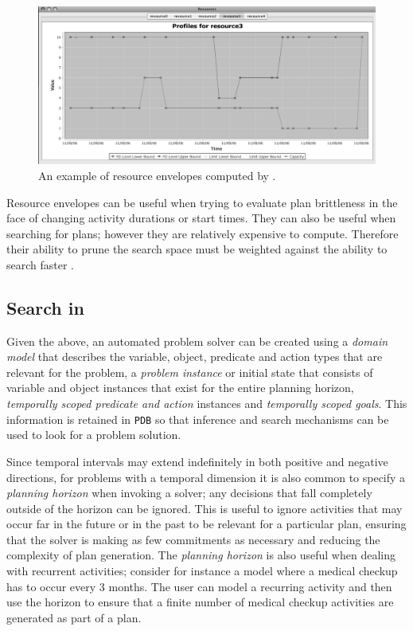 \begin{figure}
\centering
\includegraphics[scale=0.2]{figs/europa-resource-envelopes.png}
\caption{\small An example of resource envelopes computed by \eu.}
\label{fig:resenvelopes}
\end{figure}

Resource envelopes can be useful when trying to evaluate plan
brittleness in the face of changing activity durations or start
times. They can also be useful when searching for plans; however they
are relatively expensive to compute. Therefore their ability to prune
the search space must be weighted against the ability to search faster
\cite{6007772, morris11}.


\subsection{Search in \eu}
\label{sec:europa:search}

Given the above, an automated problem solver can be created using a
\emph{domain model} that describes the variable, object, predicate and
action types that are relevant for the problem, a \emph{problem
  instance} or initial state that consists of variable and object
instances that exist for the entire planning horizon, \emph{temporally
  scoped predicate and action} instances and \emph{temporally scoped
  goals}. This information is retained in \eus \texttt{PDB} so that
inference and search mechanisms can be used to look for a problem
solution.

Since temporal intervals may extend indefinitely in both positive and
negative directions, for problems with a temporal dimension it is also
common to specify a \emph{planning horizon} when invoking a solver;
any decisions that fall completely outside of the horizon can be
ignored. This is useful to ignore activities that may occur far in the
future or in the past to be relevant for a particular plan, ensuring
that the solver is making as few commitments as necessary and reducing
the complexity of plan generation.  The \emph{planning horizon} is
also useful when dealing with recurrent activities; consider for
instance a model where a medical checkup has to occur every $3$
months. The user can model a recurring activity and then use the
horizon to ensure that a finite number of medical checkup activities
are generated as part of a plan.

